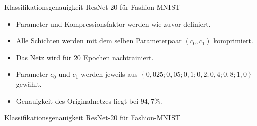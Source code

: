 \documentclass[aspectratio=169, 12pt]{beamer}
\begin{document}
\begin{frame}{Klassifikationsgenauigkeit ResNet-20 für Fashion-MNIST}
  \begin{itemize}
    \item Parameter und Kompressionsfaktor werden wie zuvor definiert.
    \item Alle Schichten werden mit dem selben Parameterpaar $(c_0, c_1)$ komprimiert.
    \item Das Netz wird für $20$ Epochen nachtrainiert.
    \item Parameter $c_0$ und $c_1$ werden jeweils aus $\left\lbrace 0{,}025; 0{,}05; 0{,}1; 0{,}2; 0{,}4; 0{,}8; 1{,}0 \right\rbrace$ gewählt.
    \item Genauigkeit des Originalnetzes liegt bei $94{,}7\%$.
  \end{itemize}  
\end{frame}

\begin{frame}{Klassifikationsgenauigkeit ResNet-20 für Fashion-MNIST}
  \begin{figure}
\end{figure}
\end{frame}
\end{document}
